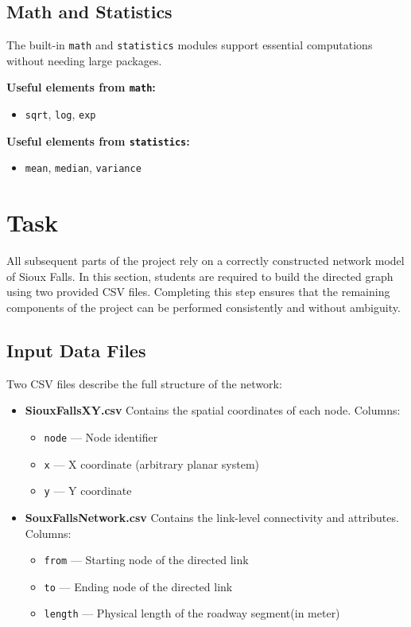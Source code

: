 \documentclass{rapportCS} %
\begin{document}
\subsection{Math and Statistics}
The built-in \texttt{math} and \texttt{statistics} modules support essential computations without needing large packages.

\textbf{Useful elements from \texttt{math}:}
\begin{itemize}
    \item \texttt{sqrt}, \texttt{log}, \texttt{exp}
\end{itemize}

\textbf{Useful elements from \texttt{statistics}:}
\begin{itemize}
    \item \texttt{mean}, \texttt{median}, \texttt{variance}
\end{itemize}

\newpage
\section{Task}

All subsequent parts of the project rely on a correctly constructed network model of Sioux Falls. In this section, students are required to build the directed graph using two provided CSV files. Completing this step ensures that the remaining components of the project can be performed consistently and without ambiguity.

\subsection{Input Data Files}

Two CSV files describe the full structure of the network:

\begin{itemize}
    \item \textbf{SiouxFallsXY.csv}  
    Contains the spatial coordinates of each node.  
    Columns:
    \begin{itemize}
        \item \texttt{node} — Node identifier
        \item \texttt{x} — X coordinate (arbitrary planar system)
        \item \texttt{y} — Y coordinate
    \end{itemize}

    \item \textbf{SouxFallsNetwork.csv}  
    Contains the link-level connectivity and attributes.  
    Columns:
    \begin{itemize}
        \item \texttt{from} — Starting node of the directed link
        \item \texttt{to} — Ending node of the directed link
        \item \texttt{length} — Physical length of the roadway segment(in meter)
    \end{itemize}
\end{itemize}
\end{document}
